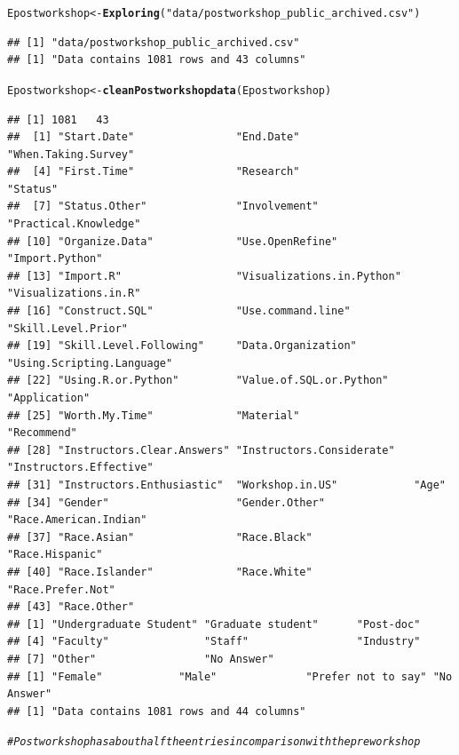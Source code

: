 \documentclass{article}\usepackage[]{graphicx}\usepackage[]{color}
\makeatletter
\newcommand{\hlstr}[1]{\textcolor[rgb]{0.192,0.494,0.8}{#1}}%
\newcommand{\hlcom}[1]{\textcolor[rgb]{0.678,0.584,0.686}{\textit{#1}}}%
\newcommand{\hlstd}[1]{\textcolor[rgb]{0.345,0.345,0.345}{#1}}%
\newcommand{\hlkwb}[1]{\textcolor[rgb]{0.69,0.353,0.396}{#1}}%
\newcommand{\hlkwd}[1]{\textcolor[rgb]{0.737,0.353,0.396}{\textbf{#1}}}%
\newenvironment{kframe}{%
 \def\at@end@of@kframe{}%
 \ifinner\ifhmode%
  \def\at@end@of@kframe{\end{minipage}}%
  \begin{minipage}{\columnwidth}%
 \fi\fi%
 \def\FrameCommand##1{\hskip\@totalleftmargin \hskip-\fboxsep
 \colorbox{shadecolor}{##1}\hskip-\fboxsep
     \hskip-\linewidth \hskip-\@totalleftmargin \hskip\columnwidth}%
 \MakeFramed {\advance\hsize-\width
   \@totalleftmargin\z@ \linewidth\hsize
   \@setminipage}}%
 {\par\unskip\endMakeFramed%
 \at@end@of@kframe}
\newenvironment{knitrout}{}{} %
\makeatother
\begin{document}
\begin{knitrout}
\color{fgcolor}\begin{kframe}
\begin{alltt}
\hlstd{Epostworkshop} \hlkwb{<-} \hlkwd{Exploring}\hlstd{(}\hlstr{"data/postworkshop_public_archived.csv"}\hlstd{)}
\end{alltt}
\begin{verbatim}
## [1] "data/postworkshop_public_archived.csv"
## [1] "Data contains 1081 rows and 43 columns"
\end{verbatim}
\begin{alltt}
\hlstd{Epostworkshop} \hlkwb{<-} \hlkwd{cleanPostworkshopdata}\hlstd{(Epostworkshop)}
\end{alltt}
\begin{verbatim}
## [1] 1081   43
##  [1] "Start.Date"                "End.Date"                  "When.Taking.Survey"       
##  [4] "First.Time"                "Research"                  "Status"                   
##  [7] "Status.Other"              "Involvement"               "Practical.Knowledge"      
## [10] "Organize.Data"             "Use.OpenRefine"            "Import.Python"            
## [13] "Import.R"                  "Visualizations.in.Python"  "Visualizations.in.R"      
## [16] "Construct.SQL"             "Use.command.line"          "Skill.Level.Prior"        
## [19] "Skill.Level.Following"     "Data.Organization"         "Using.Scripting.Language" 
## [22] "Using.R.or.Python"         "Value.of.SQL.or.Python"    "Application"              
## [25] "Worth.My.Time"             "Material"                  "Recommend"                
## [28] "Instructors.Clear.Answers" "Instructors.Considerate"   "Instructors.Effective"    
## [31] "Instructors.Enthusiastic"  "Workshop.in.US"            "Age"                      
## [34] "Gender"                    "Gender.Other"              "Race.American.Indian"     
## [37] "Race.Asian"                "Race.Black"                "Race.Hispanic"            
## [40] "Race.Islander"             "Race.White"                "Race.Prefer.Not"          
## [43] "Race.Other"               
## [1] "Undergraduate Student" "Graduate student"      "Post-doc"             
## [4] "Faculty"               "Staff"                 "Industry"             
## [7] "Other"                 "No Answer"            
## [1] "Female"            "Male"              "Prefer not to say" "No Answer"        
## [1] "Data contains 1081 rows and 44 columns"
\end{verbatim}
\begin{alltt}
\hlcom{# Postworkshop has about half the entries in comparison with the preworkshop }
\end{alltt}
\end{kframe}
\end{knitrout}
\end{document}
